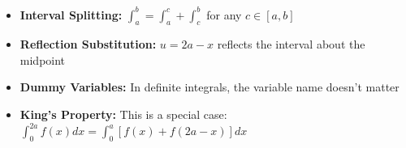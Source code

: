 \begin{takeaways}
\begin{itemize}
\item \textbf{Interval Splitting:} $\int_a^b = \int_a^c + \int_c^b$ for any $c \in [a,b]$
\item \textbf{Reflection Substitution:} $u = 2a - x$ reflects the interval about the midpoint
\item \textbf{Dummy Variables:} In definite integrals, the variable name doesn't matter
\item \textbf{King's Property:} This is a special case: $\int_0^{2a} f(x) dx = \int_0^a [f(x) + f(2a-x)] dx$
\end{itemize}
\end{takeaways}
